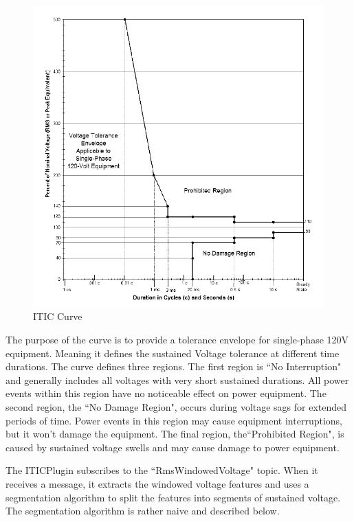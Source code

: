 \begin{figure}
	\centering
	\includegraphics[width=\linewidth]{figures/itic.png}
	\caption{ITIC Curve}
	\label{fig:IticCurve}
\end{figure}

The purpose of the curve is to provide a tolerance envelope for single-phase 120V equipment. Meaning it defines the sustained Voltage tolerance at different time durations. The curve defines three regions. The first region is ``No Interruption" and generally includes all voltages with very short sustained durations. All power events within this region have no noticeable effect on power equipment. The second region, the ``No Damage Region", occurs during voltage sags for extended periods of time. Power events in this region may cause equipment interruptions, but it won't damage the equipment. The final region, the``Prohibited Region", is caused by sustained voltage swells and may cause damage to power equipment. 

The ITICPlugin subscribes to the ``RmsWindowedVoltage" topic. When it receives a message, it extracts the windowed voltage features and uses a segmentation algorithm to split the features into segments of sustained voltage. The segmentation algorithm is rather naive and described below.

